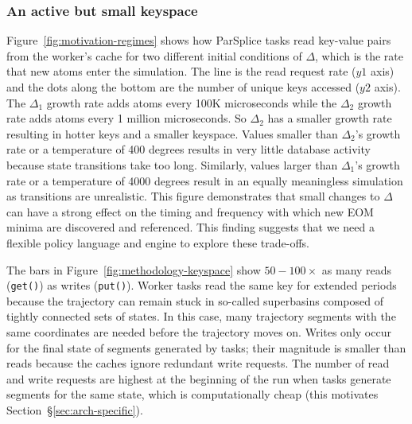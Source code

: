 \subsubsection*{An active but small keyspace}

Figure~\ref{fig:motivation-regimes} shows how ParSplice tasks read key-value
pairs from the worker's cache for two different initial conditions of
\(\Delta\), which is the rate that new atoms enter the simulation.  The line is
the read request rate (\(y1\) axis) and the dots along the bottom are the
number of unique keys accessed (\(y2\) axis).  The \(\Delta_1\) growth rate
adds atoms every 100K microseconds while the \(\Delta_2\) growth rate adds
atoms every 1 million microseconds. So \(\Delta_2\) has a smaller growth rate
resulting in hotter keys and a smaller keyspace.  Values smaller than
\(\Delta_2\)'s growth rate or a temperature of 400 degrees results in very
little database activity because state transitions take too long. Similarly,
values larger than \(\Delta_1\)'s growth rate or a temperature of 4000 degrees
result in an equally meaningless simulation as transitions are unrealistic.
This figure demonstrates that small changes to \(\Delta\) can have a strong
effect on the timing and frequency with which new EOM minima are discovered and
referenced. This finding suggests that we need a flexible policy language and
engine to explore these trade-offs.

The bars in Figure~\ref{fig:methodology-keyspace} show \(50-100\times\) as many
reads (\texttt{get()}) as writes (\texttt{put()}).  Worker tasks read the same
key for extended periods because the trajectory can remain stuck in so-called
superbasins composed of tightly connected sets of states. In this case, many
trajectory segments with the same coordinates are needed before the trajectory
moves on.  Writes only occur for the final state of segments generated by
tasks; their magnitude is smaller than reads because the caches ignore
redundant write requests. The number of read and write requests are highest at
the beginning of the run when tasks generate segments for the same state, which
is computationally cheap (this motivates Section~\S\ref{sec:arch-specific}).

